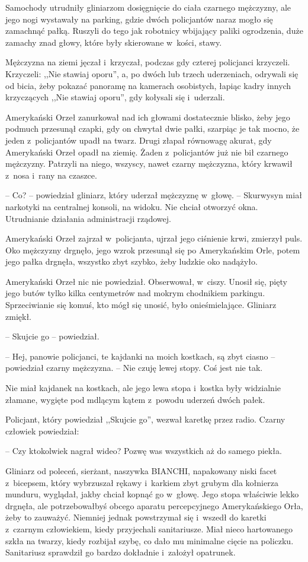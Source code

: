 \documentclass[oneside,polish,11pt,sfheadings]{mwbk}
\begin{document}
Samochody utrudniły gliniarzom dosięgnięcie do ciała czarnego mężczyzny,
ale jego nogi wystawały na parking, gdzie dwóch policjantów naraz mogło
się zamachnąć pałką. Ruszyli do tego jak robotnicy wbijający paliki
ogrodzenia, duże zamachy znad głowy, które były skierowane w~kości,
stawy.

Mężczyzna na ziemi jęczał i~krzyczał, podczas gdy czterej policjanci
krzyczeli. Krzyczeli: ,,Nie stawiaj oporu'', a, po dwóch lub trzech
uderzeniach, odrywali się od bicia, żeby pokazać panoramę na kamerach
osobistych, łapiąc kadry innych krzyczących ,,Nie stawiaj oporu'', gdy
kołysali się i~uderzali.

Amerykański Orzeł zanurkował nad ich głowami dostatecznie blisko, żeby
jego podmuch przesunął czapki, gdy on chwytał dwie pałki, szarpiąc je
tak mocno, że jeden z~policjantów upadł na twarz. Drugi złapał równowagę
akurat, gdy Amerykański Orzeł opadł na ziemię. Żaden z~policjantów już
nie bił czarnego mężczyzny. Patrzyli na niego, wszyscy, nawet czarny
mężczyzna, który krwawił z~nosa i~rany na czaszce.

-- Co? -- powiedział gliniarz, który uderzał mężczyznę w~głowę. -- Skurwysyn miał narkotyki na centralnej konsoli, na widoku. Nie chciał
otworzyć okna. Utrudnianie działania administracji rządowej.

Amerykański Orzeł zajrzał w~policjanta, ujrzał jego ciśnienie krwi,
zmierzył puls. Oko mężczyzny drgnęło, jego wzrok przesunął się po
Amerykańskim Orle, potem jego pałka drgnęła, wszystko zbyt szybko, żeby
ludzkie oko nadążyło.

Amerykański Orzeł nic nie powiedział. Obserwował, w~ciszy. Unosił się,
pięty jego butów tylko kilka centymetrów nad mokrym chodnikiem parkingu.
Sprzeciwianie się komuś, kto mógł się unosić, było onieśmielające.
Gliniarz zmiękł.

-- Skujcie go -- powiedział.

-- Hej, panowie policjanci, te kajdanki na moich kostkach, są zbyt ciasno
-- powiedział czarny mężczyzna. -- Nie czuję lewej stopy. Coś jest nie
tak.

Nie miał kajdanek na kostkach, ale jego lewa stopa i~kostka były
widzialnie złamane, wygięte pod mdlącym kątem z~powodu uderzeń dwóch
pałek.

Policjant, który powiedział ,,Skujcie go'', wezwał karetkę przez radio.
Czarny człowiek powiedział: 

-- Czy ktokolwiek nagrał wideo? Pozwę was
wszystkich aż do samego piekła. 

Gliniarz od poleceń, sierżant, naszywka BIANCHI, napakowany niski facet z~bicepsem, który wybrzuszał
rękawy i~karkiem zbyt grubym dla kołnierza munduru, wyglądał, jakby
chciał kopnąć go w~głowę. Jego stopa właściwie lekko drgnęła, ale
potrzebowałbyś obcego aparatu percepcyjnego Amerykańskiego Orła, żeby to
zauważyć. Niemniej jednak powstrzymał się i~wszedł do karetki z~czarnym
człowiekiem, kiedy przyjechali sanitariusze. Miał nieco hartowanego
szkła na twarzy, kiedy rozbijał szybę, co dało mu minimalne cięcie na
policzku. Sanitariusz sprawdził go bardzo dokładnie i~założył opatrunek.
\end{document}

